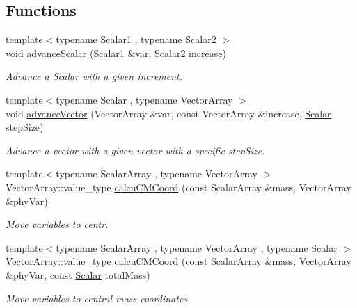 \subsection*{Functions}
\begin{DoxyCompactItemize}
\item 
{\footnotesize template$<$typename Scalar1 , typename Scalar2 $>$ }\\void \mbox{\hyperlink{namespace_space_h_a15f1fd0977da382828652627f5dbcdb9}{advance\+Scalar}} (Scalar1 \&var, Scalar2 increase)
\begin{DoxyCompactList}\small\item\em Advance a Scalar with a given increment. \end{DoxyCompactList}\item 
{\footnotesize template$<$typename Scalar , typename Vector\+Array $>$ }\\void \mbox{\hyperlink{namespace_space_h_a9f1a1d6fedf93c0324cc5993a5694e96}{advance\+Vector}} (Vector\+Array \&var, const Vector\+Array \&increase, \mbox{\hyperlink{create_kepler_8cpp_a8c2981f3f834be9448a6ab06c28748eb}{Scalar}} step\+Size)
\begin{DoxyCompactList}\small\item\em Advance a vector with a given vector with a specific step\+Size. \end{DoxyCompactList}\item 
{\footnotesize template$<$typename Scalar\+Array , typename Vector\+Array $>$ }\\Vector\+Array\+::value\+\_\+type \mbox{\hyperlink{namespace_space_h_a808af685980ae1a1ff5ea83e47f4073c}{calcu\+C\+M\+Coord}} (const Scalar\+Array \&mass, Vector\+Array \&phy\+Var)
\begin{DoxyCompactList}\small\item\em Move variables to centr. \end{DoxyCompactList}\item 
{\footnotesize template$<$typename Scalar\+Array , typename Vector\+Array , typename Scalar $>$ }\\Vector\+Array\+::value\+\_\+type \mbox{\hyperlink{namespace_space_h_a06d99fb41f10d428804c48ddb6b261c0}{calcu\+C\+M\+Coord}} (const Scalar\+Array \&mass, Vector\+Array \&phy\+Var, const \mbox{\hyperlink{create_kepler_8cpp_a8c2981f3f834be9448a6ab06c28748eb}{Scalar}} total\+Mass)
\begin{DoxyCompactList}\small\item\em Move variables to central mass coordinates. \end{DoxyCompactList}\item 

\end{DoxyCompactItemize}

